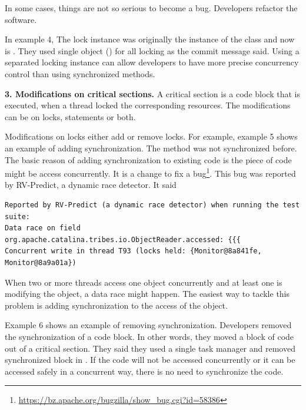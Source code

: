
In some cases, things are not so serious to become a bug. Developers refactor the software.

In example 4, The lock instance was originally the instance of the class and now is . They used single object () for all locking as the commit message said. Using a separated locking instance can allow developers to have more precise concurrency control than using synchronized methods.

\noindent
\textbf{3. Modifications on critical sections.} A critical section is a code block that is executed, when a thread locked the corresponding resources. The modifications can be on locks, statements or both.%

Modifications on locks either add or remove locks. For example, example 5 shows an example of adding synchronization. The method was not synchronized before. The basic reason of adding synchronization to existing code is the piece of code might be access concurrently. It is a change to fix a bug\footnote{\url{https://bz.apache.org/bugzilla/show\_bug.cgi?id=58386}}. This bug was reported by RV-Predict, a dynamic race detector. It said

\begin{lstlisting}
Reported by RV-Predict (a dynamic race detector) when running the test suite:
Data race on field org.apache.catalina.tribes.io.ObjectReader.accessed: {{{
Concurrent write in thread T93 (locks held: {Monitor@8a841fe, Monitor@8a9a01a})
\end{lstlisting}

When two or more threads access one object concurrently and at least one is modifying the object, a data race might happen. The easiest way to tackle this problem is adding synchronization to the access of the object.

Example 6 shows an example of removing synchronization. Developers removed the synchronization of a code block. In other words, they moved a block of code out of a critical section. They said they used a single task manager and removed synchronized block in . If the code will not be accessed concurrently or it can be accessed safely in a concurrent way, there is no need to synchronize the code.

